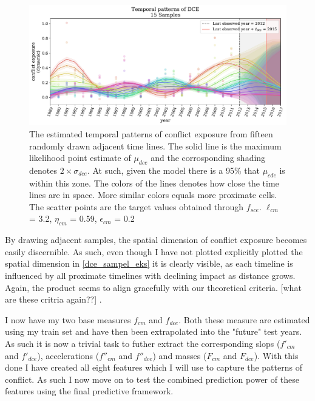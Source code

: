 \documentclass[a4paper]{article}
\begin{document}
\begin{figure}[!htb]
	\centering
	\includegraphics[scale=0.47]{dce_15_samples.pdf}
    \caption{\footnotesize{The estimated temporal patterns of conflict exposure from fifteen randomly drawn adjacent time lines. The solid line is the maximum likelihood point estimate of $\mu_{dce}$ and the corrosponding shading denotes $2\times\sigma_{dce}$. At such, given the model there is a 95\% that $\mu_{cde}$ is within this zone. The colors of the lines denotes how close the time lines are in space. More similar colors equals more proximate cells. The scatter points are the target values obtained through $f_{sce}$. $\ell_{cm}$ = 3.2, $\eta_{cm}$ = 0.59, $\epsilon_{cm}$ = 0.2}}\label{dce_sampel_eks}
\end{figure}

By drawing adjacent samples, the spatial dimension of conflict exposure becomes easily discernible. As such, even though I have not plotted explicitly plotted the spatial dimension in \autoref{dce_sampel_eks} it is clearly visible, as each timeline is influenced by all proximate timelines with declining impact as distance grows. Again, the product seems to align gracefully with our theoretical criteria.  [what are these critria again??] .\par

I now have my two base measures $f_{cm}$ and $f_{dce}$. Both these measure are estimated using my train set and have then been extrapolated into the "future" test years. As such it is now a trivial task to futher extract the corresponding slops ($f'_{cm}$ and $f'_{dce}$), accelerations ($f''_{cm}$ and $f''_{dce}$) and masses ($F_{cm}$ and $F_{dce}$). With this done I have created all eight features which I will use to capture the patterns of conflict. As such I now move on to test the combined prediction power of these features using the final predictive framework.\par
\end{document}
